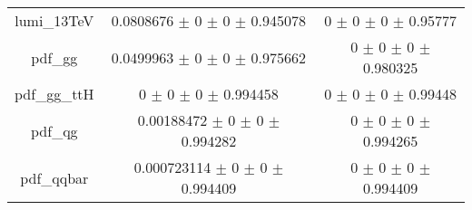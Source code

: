\begin{table}
\begin{tabular}{ccc}
lumi\_13TeV & \num{0.0808676} $\pm$ \num{0} $\pm$ \num{0} $\pm$ \num{0.945078} & \num{0} $\pm$ \num{0} $\pm$ \num{0} $\pm$ \num{0.95777}\\
pdf\_gg & \num{0.0499963} $\pm$ \num{0} $\pm$ \num{0} $\pm$ \num{0.975662} & \num{0} $\pm$ \num{0} $\pm$ \num{0} $\pm$ \num{0.980325}\\
pdf\_gg\_ttH & \num{0} $\pm$ \num{0} $\pm$ \num{0} $\pm$ \num{0.994458} & \num{0} $\pm$ \num{0} $\pm$ \num{0} $\pm$ \num{0.99448}\\
pdf\_qg & \num{0.00188472} $\pm$ \num{0} $\pm$ \num{0} $\pm$ \num{0.994282} & \num{0} $\pm$ \num{0} $\pm$ \num{0} $\pm$ \num{0.994265}\\
pdf\_qqbar & \num{0.000723114} $\pm$ \num{0} $\pm$ \num{0} $\pm$ \num{0.994409} & \num{0} $\pm$ \num{0} $\pm$ \num{0} $\pm$ \num{0.994409}\\
\bottomrule
\end{tabular}
\end{table}